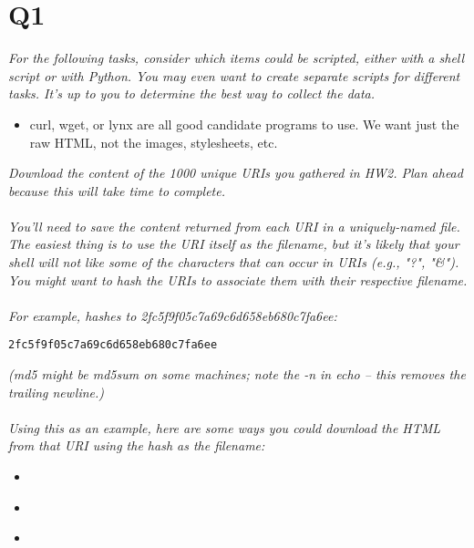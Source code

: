 \documentclass[12pt]{article}
\begin{document}
\section*{Q1}
\emph{For the following tasks, consider which items could be scripted, either with a shell script or with Python. You may even want to create separate scripts for different tasks. It's up to you to determine the best way to collect the data.\\}
\begin{itemize}
    \item  curl, wget, or lynx are all good candidate programs to use. We want just the raw HTML, not the images, stylesheets, etc.
\end{itemize}
\emph{Download the content of the 1000 unique URIs you gathered in HW2. Plan ahead because this will take time to complete.\\ \\
You'll need to save the content returned from each URI in a uniquely-named file. The easiest thing is to use the URI itself as the filename, but it's likely that your shell will not like some of the characters that can occur in URIs (e.g., "?", "\&"). You might want to hash the URIs to associate them with their respective filename.\\ \\
For example,
\href{ https://www.cnn.com/world/live-news/nasa-mars-rover-landing-02-18-21}{\color{red}{ https://www.cnn.com/world/live-news/nasa-mars-rover-landing-02-18-21}} hashes to 2fc5f9f05c7a69c6d658eb680c7fa6ee:
}
\begin{lstlisting}[numbers=none]
% echo -n "https://www.cnn.com/world/live-news/nasa-mars-rover-landing-02-18-21" | md5
2fc5f9f05c7a69c6d658eb680c7fa6ee
\end{lstlisting}
\emph{(md5 might be md5sum on some machines; note the -n in echo -- this removes the trailing newline.) \\ \\ Using this as an example, here are some ways you could download the HTML from that URI using the hash as the filename:}
\begin{itemize}
    \item \begin{lstlisting}[numbers=none]
    % curl "https://www.cnn.com/world/live-news/nasa-mars-rover-landing-02-18-21" > 2fc5f9f05c7a69c6d658eb680c7fa6ee.html
\end{lstlisting}
    \item \begin{lstlisting}[numbers=none]
    % wget -O 2fc5f9f05c7a69c6d658eb680c7fa6ee.html https://www.cnn.com/world/live-news/nasa-mars-rover-landing-02-18-21
\end{lstlisting}
    \item \begin{lstlisting}[numbers=none]
    % lynx -source https://www.cnn.com/world/live-news/nasa-mars-rover-landing-02-18-21 > 2fc5f9f05c7a69c6d658eb680c7fa6ee.html
    \end{lstlisting}
\end{itemize}
\end{document}
